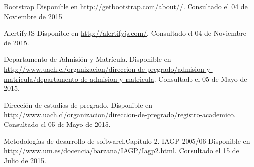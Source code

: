 \begin{spacing}{1.0}
\begin{thebibliography}{99}
\newblock Bootstrap
\newblock Disponible en \url{http://getbootstrap.com/about//}.
\newblock Consultado el 04 de Noviembre de 2015.

\newblock AlertifyJS
\newblock Disponible en \url{http://alertifyjs.com/}.
\newblock Consultado el 04 de Noviembre de 2015.

\newblock Departamento de Admisión y Matrícula.
\newblock Disponible en \url{http://www.uach.cl/organizacion/direccion-de-pregrado/admision-y-matricula/departamento-de-admision-y-matricula}.
\newblock Consultado el 05 de Mayo de 2015.


\newblock Dirección de estudios de pregrado.
\newblock Disponible en \url{http://www.uach.cl/organizacion/direccion-de-pregrado/registro-academico}.
\newblock Consultado el 05 de Mayo de 2015.


\newblock Metodologías de desarrollo de softwarel,Capítulo 2. IAGP 2005/06
\newblock Disponible en \url{http://www.um.es/docencia/barzana/IAGP/Iagp2.html}.
\newblock Consultado el 15 de Julio de 2015.


\end{thebibliography}	
\end{spacing}